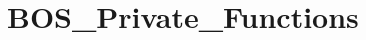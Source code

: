 \hypertarget{group___b_o_s___private___functions}{}\section{B\+O\+S\+\_\+\+Private\+\_\+\+Functions}
\label{group___b_o_s___private___functions}
